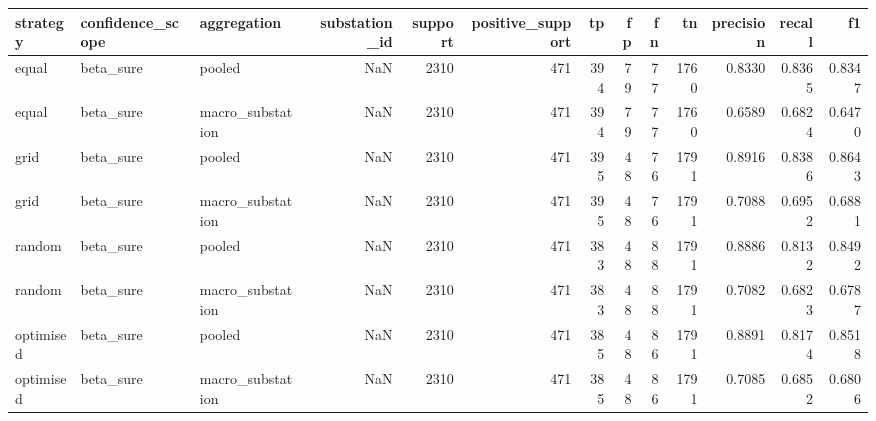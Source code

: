 \begin{tabular}{lllrrrrrrrrrr}
\toprule
strategy & confidence_scope & aggregation & substation_id & support & positive_support & tp & fp & fn & tn & precision & recall & f1 \\
\midrule
equal & beta_sure & pooled & NaN & 2310 & 471 & 394 & 79 & 77 & 1760 & 0.8330 & 0.8365 & 0.8347 \\
equal & beta_sure & macro_substation & NaN & 2310 & 471 & 394 & 79 & 77 & 1760 & 0.6589 & 0.6824 & 0.6470 \\
grid & beta_sure & pooled & NaN & 2310 & 471 & 395 & 48 & 76 & 1791 & 0.8916 & 0.8386 & 0.8643 \\
grid & beta_sure & macro_substation & NaN & 2310 & 471 & 395 & 48 & 76 & 1791 & 0.7088 & 0.6952 & 0.6881 \\
random & beta_sure & pooled & NaN & 2310 & 471 & 383 & 48 & 88 & 1791 & 0.8886 & 0.8132 & 0.8492 \\
random & beta_sure & macro_substation & NaN & 2310 & 471 & 383 & 48 & 88 & 1791 & 0.7082 & 0.6823 & 0.6787 \\
optimised & beta_sure & pooled & NaN & 2310 & 471 & 385 & 48 & 86 & 1791 & 0.8891 & 0.8174 & 0.8518 \\
optimised & beta_sure & macro_substation & NaN & 2310 & 471 & 385 & 48 & 86 & 1791 & 0.7085 & 0.6852 & 0.6806 \\
\bottomrule
\end{tabular}
